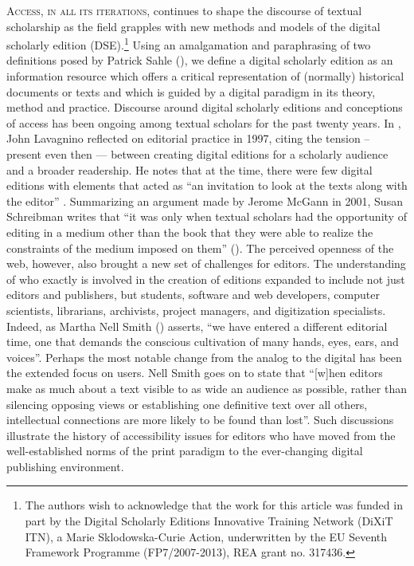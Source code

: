 \begin{paper}
\textsc{Access, in all its iterations}, continues to shape the discourse of
textual scholarship as the field grapples with new methods and models of
the digital scholarly edition (DSE).\footnote{The authors wish to
  acknowledge that the work for this article was funded in part by the
  Digital Scholarly Editions Innovative Training Network (DiXiT ITN), a
  Marie Sklodowska-Curie Action, underwritten by the EU Seventh
  Framework Programme (FP7/2007-2013), REA grant no. 317436.} Using an
amalgamation and paraphrasing of two definitions posed by Patrick
Sahle (\citeyear{sahle_catalog_2008,sahle_what_2016}), we define a digital scholarly edition as an
information resource which offers a critical representation of
(normally) historical documents or texts and which is guided by a
digital paradigm in its theory, method and practice. Discourse around
digital scholarly editions and conceptions of access has been ongoing
among textual scholars for the past twenty years. In \citeyear{lavagnino_access_2009}, John
Lavagnino reflected on editorial practice in 1997, citing the tension --
present even then --- between creating digital editions for a scholarly
audience and a broader readership. He notes that at the time, there were
few digital editions with elements that acted as ``an invitation to look
at the texts along with the editor'' \citep[67]{lavagnino_access_2009}. Summarizing
an argument made by Jerome McGann in 2001, Susan Schreibman writes that
``it was only when textual scholars had the opportunity of editing in a
medium other than the book that they were able to realize the
constraints of the medium imposed on them'' (\citeyear{schreibman_digital_2019}). The perceived
openness of the web, however, also brought a new set of challenges for
editors. The understanding of who exactly is involved in the creation of
editions expanded to include not just editors and publishers, but
students, software and web developers, computer scientists, librarians,
archivists, project managers, and digitization specialists. Indeed, as
Martha Nell Smith (\citeyear{smith_electronic_2004}) asserts, ``we have entered a different
editorial time, one that demands the conscious cultivation of many
hands, eyes, ears, and voices''. Perhaps the most notable change from
the analog to the digital has been the extended focus on users. Nell
Smith goes on to state that ``{[}w{]}hen editors make as much about a
text visible to as wide an audience as possible, rather than silencing
opposing views or establishing one definitive text over all others,
intellectual connections are more likely to be found than lost''. Such
discussions illustrate the history of accessibility issues for editors
who have moved from the well-established norms of the print paradigm to
the ever-changing digital publishing environment.


\end{paper}
